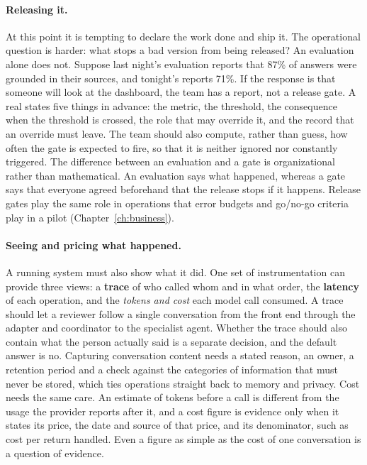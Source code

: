 \paragraph{Releasing it.} At this point it is tempting to declare the work done and ship it. The operational question is harder: what stops a bad version from being released? An evaluation alone does not. Suppose last night's evaluation reports that 87\% of answers were grounded in their sources, and tonight's reports 71\%. If the response is that someone will look at the dashboard, the team has a report, not a release gate. A real  states five things in advance: the metric, the threshold, the consequence when the threshold is crossed, the role that may override it, and the record that an override must leave. The team should also compute, rather than guess, how often the gate is expected to fire, so that it is neither ignored nor constantly triggered. The difference between an evaluation and a gate is organizational rather than mathematical. An evaluation says what happened, whereas a gate says that everyone agreed beforehand that the release stops if it happens. Release gates play the same role in operations that error budgets and go/no-go criteria play in a pilot (Chapter~\ref{ch:business}).

\paragraph{Seeing and pricing what happened.} A running system must also show what it did. One set of instrumentation can provide three views: a \textbf{trace} of who called whom and in what order, the \textbf{latency} of each operation, and the \emph{tokens and cost} each model call consumed. A trace should let a reviewer follow a single conversation from the front end through the adapter and coordinator to the specialist agent. Whether the trace should also contain what the person actually said is a separate decision, and the default answer is no. Capturing conversation content needs a stated reason, an owner, a retention period and a check against the categories of information that must never be stored, which ties operations straight back to memory and privacy. Cost needs the same care. An estimate of tokens before a call is different from the usage the provider reports after it, and a cost figure is evidence only when it states its price, the date and source of that price, and its denominator, such as cost per return handled. Even a figure as simple as the cost of one conversation is a question of evidence.

